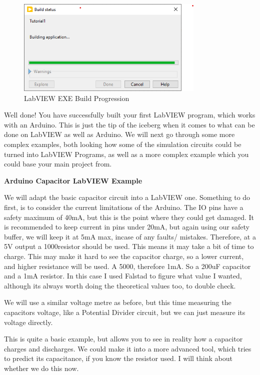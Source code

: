\documentclass[a4paper,11pt]{report}
\begin{document}
\begin{figure}[H]
\centering
\includegraphics[width=0.8\textwidth]{screenshots/labview44}
\caption{LabVIEW EXE Build Progression}
\end{figure}

Well done! You have successfully built your first LabVIEW program, which works with an Arduino. This is just the tip of the iceberg when it comes to what can be done on LabVIEW as well as Arduino. We will next go through some more complex examples, both looking how some of the simulation circuits could be turned into LabVIEW Programs, as well as a more complex example which you could base your main project from.

\textbf{Arduino Capacitor LabVIEW Example}

We will adapt the basic capacitor circuit into a LabVIEW one. Something to do first, is to consider the current limitations of the Arduino. The IO pins have a safety maximum of 40mA, but this is the point where they could get damaged. It is recommended to keep current in pins under 20mA, but again using our safety buffer, we will keep it at 5mA max, incase of any faults/ mistakes. Therefore, at a 5V output a 1000\ohm resistor should be used. This means it may take a bit of time to charge. This may make it hard to see the capacitor charge, so a lower current, and higher resistance will be used. A 5000\ohm, therefore 1mA. So a 200uF capacitor and a 1mA resistor. In this case I used Falstad to figure what value I wanted, although its always worth doing the theoretical values too, to double check.

We will use a similar voltage metre as before, but this time measuring the capacitors voltage, like a Potential Divider circuit, but we can just measure its voltage directly.

This is quite a basic example, but allows you to see in reality how a capacitor charges and discharges. We could make it into a more advanced tool, which tries to predict its capacitance, if you know the resistor used. I will think about whether we do this now.
\end{document}
